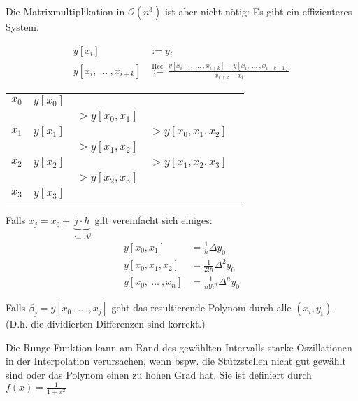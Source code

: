 Die Matrixmultiplikation in $\mathcal{O}(n^3)$ ist aber nicht nötig: Es gibt ein effizienteres System. 

\setcounter{all}{5}
\begin{multicols}{2}
    \begin{align*}
        y[x_i] &:= y_i \\
        y[x_i,\ \ldots\ ,x_{i+k}] &\overset{\text{Rec.}}{:=} \frac{y[x_{i+1},\ \ldots\ , x_{i+k}] - y[x_i,\ \ldots\ , x_{i+k-1}]}{x_{i+k}-x_i}
    \end{align*}

    \newcolumn

    \begin{center}
    \begin{tabular}{l|llll}
        $x_0$ & $y[x_0]$ \\
            &          & $>y[x_0,x_1]$        \\
        $x_1$ & $y[x_1]$ &  & $>y[x_0,x_1,x_2]$ \\ 
            &          & $>y[x_1,x_2]$        \\
        $x_2$ & $y[x_2]$ &  & $>y[x_1,x_2,x_3]$ \\
            &          & $>y[x_2,x_3]$        \\
        $x_3$ & $y[x_3]$                        \\
    \end{tabular}
    \end{center}
\end{multicols}


Falls $x_j = x_0 + \underbrace{j \cdot h}_{:= \Delta^j}$ gilt vereinfacht sich einiges:
\begin{align*}
    y[x_0,x_1] &= \frac{1}{h}\Delta y_0 \\
    y[x_0,x_1,x_2] &= \frac{1}{2!h} \Delta^2 y_0 \\
    y[x_0,\ \ldots\ , x_n] &= \frac{1}{n! h^n} \Delta^n y_0 
\end{align*}

\setcounter{all}{8}
 Falls $\beta_j = y[x_0,\ \ldots\ , x_j]$ geht das resultierende Polynom durch alle $(x_i,y_i)$.\\
\footnotesize
(D.h. die dividierten Differenzen sind korrekt.)
\normalsize

 Die Runge-Funktion kann am Rand des gewählten Intervalls starke Oszillationen in der Interpolation verursachen, 
wenn bspw. die Stützstellen nicht gut gewählt sind oder das Polynom einen zu hohen Grad hat.
Sie ist definiert durch $\displaystyle f(x) = \frac{1}{1 + x^2}$


